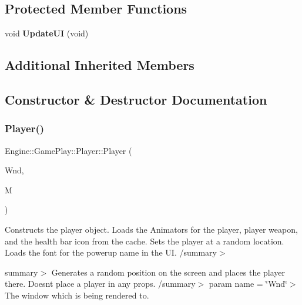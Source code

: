 \subsection*{Protected Member Functions}
\begin{DoxyCompactItemize}
\item 
\mbox{\label{class_engine_1_1_game_play_1_1_player_a1ed8e67b1e585015f13614277470a188}} 
void {\bfseries Update\+UI} (void)
\end{DoxyCompactItemize}
\subsection*{Additional Inherited Members}


\subsection{Constructor \& Destructor Documentation}
\mbox{\label{class_engine_1_1_game_play_1_1_player_accf9a014d2a29a17582907f6b042553b}} 
\subsubsection{\texorpdfstring{Player()}{Player()}}
{\footnotesize\ttfamily Engine\+::\+Game\+Play\+::\+Player\+::\+Player (\begin{DoxyParamCaption}\item[{Render\+Window $\ast$}]{Wnd,  }\item[{\hyperlink{class_engine_1_1_core_1_1_map}{Map}}]{M }\end{DoxyParamCaption})}



Constructs the player object. Loads the Animators for the player, player weapon, and the health bar icon from the cache. Sets the player at a random location. Loads the font for the powerup name in the UI. /summary$>$ 

summary$>$ Generates a random position on the screen and places the player there. Doesn\textquotesingle{}t place a player in any props. /summary$>$ param name = \char`\"{}\+Wnd\char`\"{}$>$The window which is being rendered to.

